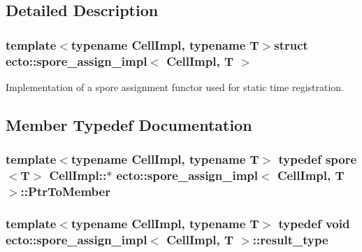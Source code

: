 \subsection{\-Detailed \-Description}
\subsubsection*{template$<$typename \-Cell\-Impl, typename \-T$>$struct ecto\-::spore\-\_\-assign\-\_\-impl$<$ Cell\-Impl, T $>$}

\-Implementation of a spore assignment functor used for static time registration. 

\subsection{\-Member \-Typedef \-Documentation}
\hypertarget{structecto_1_1spore__assign__impl_a374a7ffdead1191878d49a6ef295ada6}{
\subsubsection[{\-Ptr\-To\-Member}]{\setlength{\rightskip}{0pt plus 5cm}template$<$typename \-Cell\-Impl, typename \-T$>$ typedef {\bf spore}$<$\-T$>$ \-Cell\-Impl\-::$\ast$ {\bf ecto\-::spore\-\_\-assign\-\_\-impl}$<$ \-Cell\-Impl, \-T $>$\-::{\bf \-Ptr\-To\-Member}}}\label{structecto_1_1spore__assign__impl_a374a7ffdead1191878d49a6ef295ada6}
\hypertarget{structecto_1_1spore__assign__impl_a4947968d387bce16aab17acdfd094019}{
\subsubsection[{result\-\_\-type}]{\setlength{\rightskip}{0pt plus 5cm}template$<$typename \-Cell\-Impl, typename \-T$>$ typedef void {\bf ecto\-::spore\-\_\-assign\-\_\-impl}$<$ \-Cell\-Impl, \-T $>$\-::{\bf result\-\_\-type}}}\label{structecto_1_1spore__assign__impl_a4947968d387bce16aab17acdfd094019}


